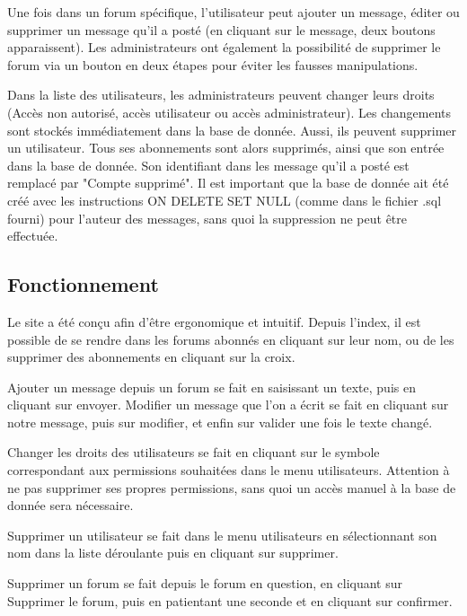 \documentclass[10pt,a4paper]{article}
\begin{document}
	Une fois dans un forum spécifique, l'utilisateur peut ajouter un message, éditer ou supprimer un message qu'il a posté (en cliquant sur le message, deux boutons apparaissent). Les administrateurs ont également la possibilité de supprimer le forum via un bouton en deux étapes pour éviter les fausses manipulations.
	
	Dans la liste des utilisateurs, les administrateurs peuvent changer leurs droits (Accès non autorisé, accès utilisateur ou accès administrateur). Les changements sont stockés immédiatement dans la base de donnée. Aussi, ils peuvent supprimer un utilisateur. Tous ses abonnements sont alors supprimés, ainsi que son entrée dans la base de donnée. Son identifiant dans les message qu'il a posté est remplacé par "Compte supprimé". Il est important que la base de donnée ait été créé avec les instructions ON DELETE SET NULL (comme dans le fichier .sql fourni) pour l'auteur des messages, sans quoi la suppression ne peut être effectuée.
	
	\subsection{Fonctionnement}
	
	Le site a été conçu afin d'être ergonomique et intuitif. Depuis l'index, il est possible de se rendre dans les forums abonnés en cliquant sur leur nom, ou de les supprimer des abonnements en cliquant sur la croix.
	
	Ajouter un message depuis un forum se fait en saisissant un texte, puis en cliquant sur envoyer. Modifier un message que l'on a écrit se fait en cliquant sur notre message, puis sur modifier, et enfin sur valider une fois le texte changé.
	
	Changer les droits des utilisateurs se fait en cliquant sur le symbole correspondant aux permissions souhaitées dans le menu utilisateurs. Attention à ne pas supprimer ses propres permissions, sans quoi un accès manuel à la base de donnée sera nécessaire.
	
	Supprimer un utilisateur se fait dans le menu utilisateurs en sélectionnant son nom dans la liste déroulante puis en cliquant sur supprimer.
	
	Supprimer un forum se fait depuis le forum en question, en cliquant sur Supprimer le forum, puis en patientant une seconde et en cliquant sur confirmer.
\end{document}
